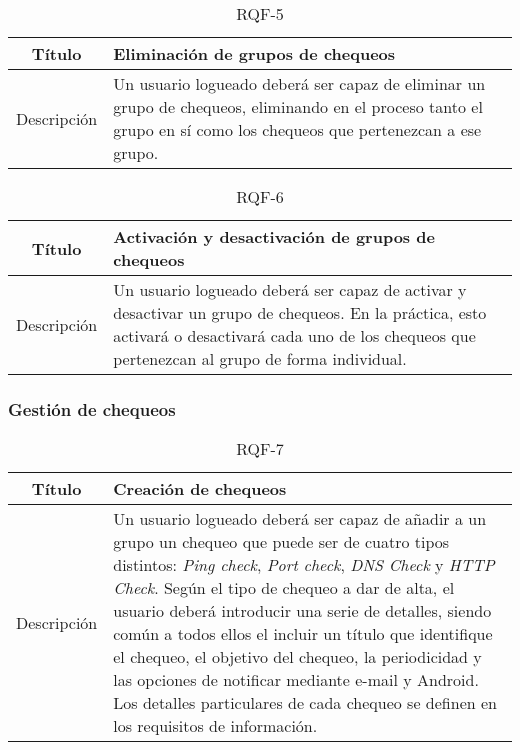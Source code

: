 \begin{table}[h!]
  \centering
  \begin{tabularx}{\textwidth}{|c|X|}
    \hline
    Título & Eliminación de grupos de chequeos \\

    \hline

    Descripción & Un usuario logueado deberá ser capaz de eliminar un grupo de
    chequeos, eliminando en el proceso tanto el grupo en sí como los chequeos
    que pertenezcan a ese grupo. \\

    \hline
  \end{tabularx}
  \caption{RQF-5}
\end{table}

\begin{table}[h!]
  \centering
  \begin{tabularx}{\textwidth}{|c|X|}
    \hline
    Título & Activación y desactivación de grupos de chequeos \\

    \hline

    Descripción & Un usuario logueado deberá ser capaz de activar y desactivar
    un grupo de chequeos. En la práctica, esto activará o desactivará cada uno
    de los chequeos que pertenezcan al grupo de forma individual. \\

    \hline
  \end{tabularx}
  \caption{RQF-6}
\end{table}

\FloatBarrier
\subsubsection{Gestión de chequeos}

\begin{table}[h!]
  \centering
  \begin{tabularx}{\textwidth}{|c|X|}
    \hline
    Título & Creación de chequeos \\

    \hline

    Descripción & Un usuario logueado deberá ser capaz de añadir a un grupo un
    chequeo que puede ser de cuatro tipos distintos: \textit{Ping check},
    \textit{Port check}, \textit{DNS Check} y \textit{HTTP Check}. Según el tipo
    de chequeo a dar de alta, el usuario deberá introducir una serie de
    detalles, siendo común a todos ellos el incluir un título que identifique el
    chequeo, el objetivo del chequeo, la periodicidad y las opciones de
    notificar mediante e-mail y Android.  Los detalles particulares de cada
    chequeo se definen en los
    requisitos de información. \\

    \hline
  \end{tabularx}
  \caption{RQF-7}
\end{table}


